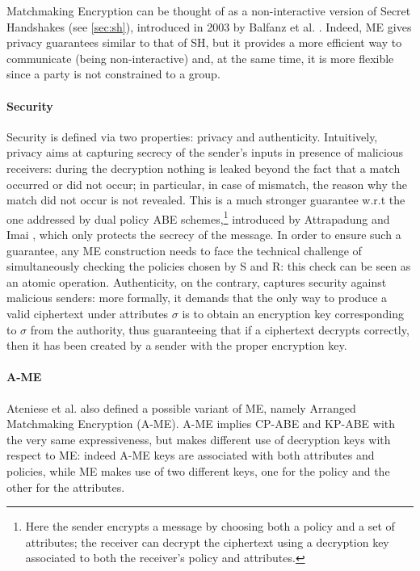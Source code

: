 Matchmaking Encryption can be thought of as a non-interactive version of Secret Handshakes (see \ref{sec:sh}), introduced in 2003 by Balfanz et al. \cite{Balfanz}.
Indeed, ME gives privacy guarantees similar to that of SH, but it provides a more efficient way to communicate (being non-interactive) and, at the same time, it is more flexible since a party is not constrained to a group.

\paragraph{Security}
Security is defined via two properties: privacy and authenticity.
Intuitively, privacy aims at capturing secrecy of the sender’s inputs in presence of malicious receivers: during the decryption nothing is leaked beyond the fact that a match occurred or did not occur; in particular, in case of mismatch, the reason why the match did not occur is not revealed.
This is a much stronger guarantee w.r.t the one addressed by dual policy ABE schemes,\footnote{Here the sender encrypts a message by choosing both a policy and a set of attributes; the receiver can decrypt the ciphertext using a decryption key associated to both the receiver’s policy and attributes.} introduced by Attrapadung and Imai \cite{Attrapadung}, which only protects the secrecy of the message.
In order to ensure such a guarantee, any ME construction needs to face the technical challenge of simultaneously checking the policies chosen by S and R: this check can be seen as an atomic operation.
\newline\newline
Authenticity, on the contrary, captures security against malicious senders: more formally, it demands that the only way to produce a valid ciphertext under attributes $\sigma$ is to obtain an encryption key corresponding to $\sigma$ from the authority, thus guaranteeing that if a ciphertext decrypts correctly, then it has been created by a sender with the proper encryption key.

\paragraph{A-ME}
Ateniese et al. also defined a possible variant of ME, namely Arranged Matchmaking Encryption (A-ME).
A-ME implies CP-ABE and KP-ABE with the very same expressiveness, but makes different use of decryption keys with respect to ME: indeed A-ME keys are associated with both attributes and policies, while ME makes use of two different keys, one for the policy and the other for the attributes.

